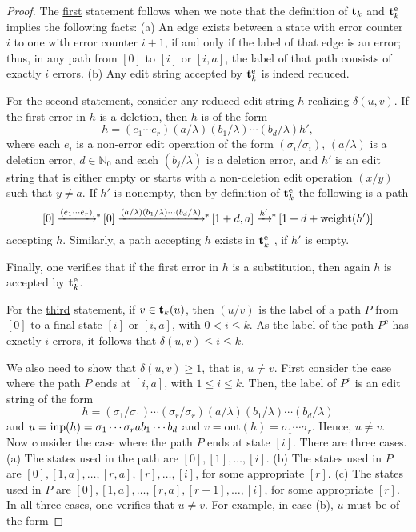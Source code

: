 \documentclass{article}
\theoremstyle{plain}
\theoremstyle{definition}
\theoremstyle{remark}
\newcommand{\N}{\mathbb{N}}
\newcommand{\xras}[1]{\xrightarrow{#1}\!\!{}^*\,}
\newcommand{\e}{\lambda}
\newcommand\tsid{\trt_{k}}
\newcommand\dsid{\ensuremath{\delta}\xspace}
\newcommand{\epath}{P^{\mathrm{e}}}
\newcommand{\etsid}{\tsid^{\mathrm{e}}}
\newcommand\out{\mathrm{out}}
\begin{document}
\begin{proof}
The \underline{first} statement follows when we note that the  definition of $\tsid$ and $\etsid$ implies the
following facts: (a) An edge exists between a state
with error counter $i$ to one with error counter  $i+1$,
if and only if the label of that edge is an error;
thus, in any path from $[0]$ to $[i]$ or $[i,a]$, the label of that path consists of exactly $i$ errors.
(b) Any edit string accepted by $\etsid$ is indeed reduced.
\par
For the \underline{second} statement, consider any reduced edit string $h$ realizing $\dsid(u,v)$.
If the first error in $h$ is a deletion, then $h$ is of
the form
      \[
      h=(e_1\cdots e_r)(a/\e)(b_1/\e)\cdots(b_d/\e)h',
      \]
where each $e_i$ is a non-error edit operation
of the form $(\sigma_i/\sigma_i)$, $(a/\e)$
is a deletion error, $d\in\N_0$ and each $(b_j/\e)$ is
a deletion error, and $h'$ is an edit string that is
either empty
or starts with a non-deletion edit operation $(x/y)$
such that $y\not=a$. If $h'$ is nonempty, then by definition of $\etsid$ the
following is a path
\[
[0]\xras{(e_1\cdots e_r)}[0]\xras{(a/\e)(b_1/\e)\cdots(b_d/\e)}[1+d,a]
\xras{h'}[1+d+\weight{h'}]
\]
accepting $h$. Similarly, a path accepting $h$ exists in
$\etsid$ , if $h'$ is empty.
\par
Finally, one verifies that if the first error in $h$
is a substitution, then again $h$ is accepted by $\etsid$.
\par
For the \underline{third} statement, if $v\in\tsid(u)$, then $(u/v)$ is the label of a path $P$ from $[0]$
to a final state $[i]$ or $[i,a]$, with $0<i\le k$. As the label of the path $\epath$ has exactly $i$ errors,
it follows that $\dsid(u,v)\le i\le k$.
\par
 We also need to show that $\dsid(u,v)\ge1$, that is, $u\not=v$.
First consider the case where the path $P$ ends at $[i,a]$, with $1\le i\le k$. Then,
the label of $\epath$ is an edit string of the form
$$h=(\sigma_1/\sigma_1)\cdots(\sigma_r/\sigma_r)(a/\e)
(b_1/\e)\cdots(b_d/\e)$$
and $u=\mathrm{inp}(h)= \sigma_1\cdots \sigma_r a b_1\cdots b_d$ and $v=\out(h)=\sigma_1\cdots\sigma_r$.
Hence, $u\not=v$. Now consider the case where the path $P$ ends at state $[i]$.
There are three cases. (a) The states used in the path are $[0], [1],\ldots,[i]$.
(b) The states used in $P$ are $[0],[1,a],\ldots,[r,a],[r],\ldots,[i]$, for some appropriate $[r]$.
(c)  The states used in $P$ are $[0],[1,a],\ldots,[r,a],[r+1],\ldots,[i]$, for some appropriate $[r]$.
In all three cases, one verifies that $u\not=v$. For example, in case (b), $u$ must be of the form

\end{proof}
\end{document}
